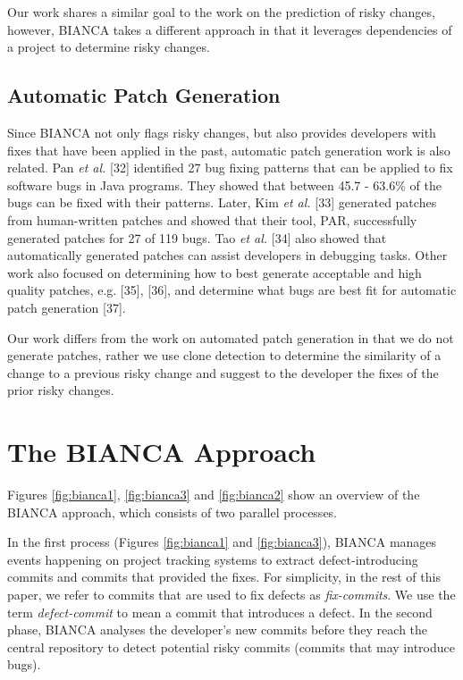 \documentclass[conference]{IEEEtran}
\begin{document}
Our work shares a similar goal to the work on the prediction of risky
changes, however, BIANCA takes a different approach in that it leverages
dependencies of a project to determine risky changes.

\subsection{Automatic Patch
Generation}\label{automatic-patch-generation}

Since BIANCA not only flags risky changes, but also provides developers
with fixes that have been applied in the past, automatic patch
generation work is also related. Pan \emph{et al.} {[}32{]} identified
27 bug fixing patterns that can be applied to fix software bugs in Java
programs. They showed that between 45.7 - 63.6\% of the bugs can be
fixed with their patterns. Later, Kim \emph{et al.} {[}33{]} generated
patches from human-written patches and showed that their tool, PAR,
successfully generated patches for 27 of 119 bugs. Tao \emph{et al.}
{[}34{]} also showed that automatically generated patches can assist
developers in debugging tasks. Other work also focused on determining
how to best generate acceptable and high quality patches, e.g. {[}35{]},
{[}36{]}, and determine what bugs are best fit for automatic patch
generation {[}37{]}.

Our work differs from the work on automated patch generation in that we
do not generate patches, rather we use clone detection to determine the
similarity of a change to a previous risky change and suggest to the
developer the fixes of the prior risky changes.

\section{The BIANCA Approach}\label{sec:bianca}

Figures \ref{fig:bianca1}, \ref{fig:bianca3} and \ref{fig:bianca2} show
an overview of the BIANCA approach, which consists of two parallel
processes.

In the first process (Figures \ref{fig:bianca1} and \ref{fig:bianca3}),
BIANCA manages events happening on project tracking systems to extract
defect-introducing commits and commits that provided the fixes. For
simplicity, in the rest of this paper, we refer to commits that are used
to fix defects as \emph{fix-commits}. We use the term
\emph{defect-commit} to mean a commit that introduces a defect. In the
second phase, BIANCA analyses the developer's new commits before they
reach the central repository to detect potential risky commits (commits
that may introduce bugs).
\end{document}
